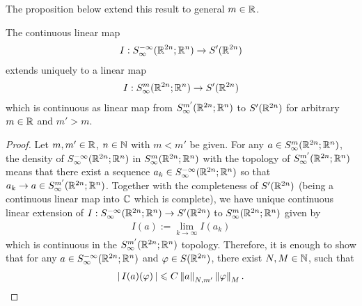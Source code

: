 \documentclass{article}
\begin{document}
The proposition below extend this result to general $m \in \R$. 
\begin{fprop}
    The continuous linear map 
    \begin{align*}
    I : S^{-\infty}_\infty(\R^{2n}; \R^n) \to S'(\R^{2n}) \\
    \end{align*}
    extends uniquely to a linear map 
    \begin{align*}
    I: S^{m}_\infty(\R^{2n}; \R^n) \to S'(\R^{2n})
    \end{align*}
    which is continuous as linear map from $S^{m'}_\infty(\R^{2n}; \R^n)$ to $S'(\R^{2n})$ for arbitrary $m \in \R$ and $m ' > m$. 
\end{fprop}
\begin{proof}
    Let $m, m' \in \R$, $n \in \N$ with $m < m' $ be given. For any $a \in S^{m}_\infty(\R^{2n}; \R^n)$, the density of $S^{-\infty}_\infty(\R^{2n}; \R^n)$ in  $S^{m}_\infty(\R^{2n}; \R^n)$ with the topology of $S^{m'}_\infty(\R^{2n}; \R^n)$ means that there exist a sequence $a_k \in S^{-\infty}_\infty(\R^{2n}; \R^n)$ so that $a_k \to a \in S^{m'}_\infty(\R^{2n}; \R^n)$. Together with the completeness of $S'(\R^{2n})$ (being a continuous linear map into $\C$ which is complete), we have unique continuous linear extension of $I : S^{-\infty}_\infty(\R^{2n}; \R^n) \to S'(\R^{2n})$ to $S^{m}_\infty(\R^{2n}; \R^n)$ given by
    \begin{align*}
    I(a) := \lim_{k \to \infty}I(a_k)
    \end{align*}
    which is continuous in the $S^{m'}_\infty(\R^{2n}; \R^n)$ topology. Therefore, it is enough to show that for any $a \in S^{-\infty}_\infty(\R^{2n}; \R^n) $ and $\varphi \in S(\R^{2n})$, there exist $N, M \in \N$, such that 
    \begin{align*}
    \abs{I(a)(\varphi)} \leq C \norm[a]_{N, m'} \norm[\varphi]_M. 
    \end{align*}
    

\end{proof}
\end{document}
